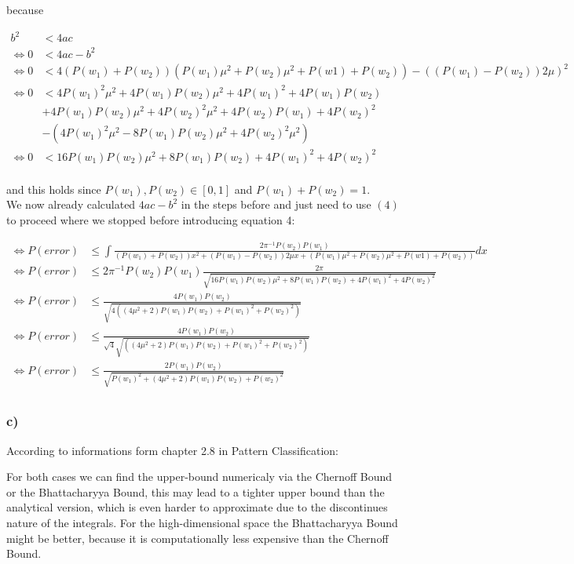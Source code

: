 \documentclass[10pt,a4paper]{article}
\begin{document}
because

\begin{align*}
    b^2 &< 4ac \\
    \Leftrightarrow 0 &< 4ac-b^2 \\
    \Leftrightarrow 0 &< 4(P(w_1)+P(w_2))(P(w_1)\mu^2 + P(w_2)\mu^2+P(w1)+P(w_2))-((P(w_1)-P(w_2))2\mu)^2 \\
    \Leftrightarrow 0 &< 4P(w_1)^2\mu^2 + 4P(w_1)P(w_2)\mu^2+4P(w_1)^2+4P(w_1)P(w_2) \\
    &+ 4P(w_1)P(w_2)\mu^2+4P(w_2)^2\mu^2+ 4P(w_2)P(w_1)+4P(w_2)^2 \\
    &- (4P(w_1)^2\mu^2-8P(w_1)P(w_2)\mu^2+4P(w_2)^2\mu^2) \\
    \Leftrightarrow 0 &< 16P(w_1)P(w_2)\mu^2+8P(w_1)P(w_2)+4P(w_1)^2+4P(w_2)^2 \\
\end{align*}

and this holds since $P(w_1), P(w_2) \in [0,1]$ and $P(w_1) + P(w_2) = 1$.\\
We now already calculated $4ac-b^2$ in the steps before and just need to use $(4)$ to proceed where we stopped before introducing equation 4:

\begin{align*}
    \Leftrightarrow P(error) &\le \int \frac{2 \pi^{-1} P(w_2) P(w_1)}{(P(w_1)+P(w_2))x^2 + (P(w_1)-P(w_2))2\mu x + (P(w_1)\mu^2 + P(w_2)\mu^2+P(w1)+P(w_2))}dx \\
    \Leftrightarrow P(error) &\le 2 \pi^{-1} P(w_2) P(w_1) \frac{2\pi}{\sqrt{16P(w_1)P(w_2)\mu^2+8P(w_1)P(w_2)+4P(w_1)^2+4P(w_2)^2}} \\
    \Leftrightarrow P(error) &\le \frac{4 P(w_1) P(w_2) }{\sqrt{4((4\mu^2+2)P(w_1)P(w_2)+P(w_1)^2+P(w_2)^2)}} \\
    \Leftrightarrow P(error) &\le \frac{4 P(w_1) P(w_2) }{\sqrt{4}\sqrt{((4\mu^2+2)P(w_1)P(w_2)+P(w_1)^2+P(w_2)^2)}} \\
    \Leftrightarrow P(error) &\le \frac{2 P(w_1) P(w_2) }{\sqrt{P(w_1)^2+(4\mu^2+2)P(w_1)P(w_2)+P(w_2)^2}} \\
\end{align*}

\subsubsection*{c)}
According to informations form chapter 2.8 in Pattern Classification:

For both cases we can find the upper-bound numericaly via the Chernoff Bound or the Bhattacharyya Bound, this may lead to a tighter upper bound than the analytical version, which is even harder to approximate due to the discontinues nature of the integrals. For the high-dimensional space the Bhattacharyya Bound might be better, because it is computationally less expensive than the Chernoff Bound.
\end{document}
